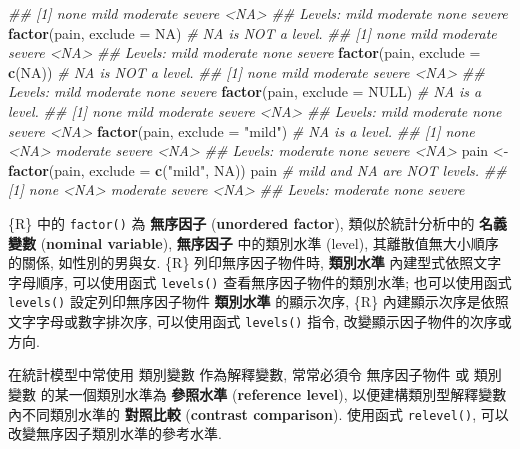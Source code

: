 \documentclass[
]{book}
\newenvironment{Shaded}{\begin{snugshade}}{\end{snugshade}}
\newcommand{\CommentTok}[1]{\textcolor[rgb]{0.56,0.35,0.01}{\textit{#1}}}
\newcommand{\DataTypeTok}[1]{\textcolor[rgb]{0.13,0.29,0.53}{#1}}
\newcommand{\KeywordTok}[1]{\textcolor[rgb]{0.13,0.29,0.53}{\textbf{#1}}}
\newcommand{\NormalTok}[1]{#1}
\newcommand{\OtherTok}[1]{\textcolor[rgb]{0.56,0.35,0.01}{#1}}
\newcommand{\StringTok}[1]{\textcolor[rgb]{0.31,0.60,0.02}{#1}}
\begin{document}
\begin{Shaded}
\begin{Highlighting}[]
\CommentTok{\#\# [1] none     mild     moderate severe   \textless{}NA\textgreater{}    }
\CommentTok{\#\# Levels: mild moderate none severe}
\KeywordTok{factor}\NormalTok{(pain, }\DataTypeTok{exclude =} \OtherTok{NA}\NormalTok{) }\CommentTok{\# NA is NOT a level.}
\CommentTok{\#\# [1] none     mild     moderate severe   \textless{}NA\textgreater{}    }
\CommentTok{\#\# Levels: mild moderate none severe}
\KeywordTok{factor}\NormalTok{(pain, }\DataTypeTok{exclude =} \KeywordTok{c}\NormalTok{(}\OtherTok{NA}\NormalTok{)) }\CommentTok{\# NA is NOT a level.}
\CommentTok{\#\# [1] none     mild     moderate severe   \textless{}NA\textgreater{}    }
\CommentTok{\#\# Levels: mild moderate none severe}
\KeywordTok{factor}\NormalTok{(pain, }\DataTypeTok{exclude =} \OtherTok{NULL}\NormalTok{) }\CommentTok{\# NA is a level.}
\CommentTok{\#\# [1] none     mild     moderate severe   \textless{}NA\textgreater{}    }
\CommentTok{\#\# Levels: mild moderate none severe \textless{}NA\textgreater{}}
\KeywordTok{factor}\NormalTok{(pain, }\DataTypeTok{exclude =} \StringTok{"mild"}\NormalTok{) }\CommentTok{\# NA is a level.}
\CommentTok{\#\# [1] none     \textless{}NA\textgreater{}     moderate severe   \textless{}NA\textgreater{}    }
\CommentTok{\#\# Levels: moderate none severe \textless{}NA\textgreater{}}
\NormalTok{pain \textless{}{-}}\StringTok{ }\KeywordTok{factor}\NormalTok{(pain, }\DataTypeTok{exclude =} \KeywordTok{c}\NormalTok{(}\StringTok{"mild"}\NormalTok{, }\OtherTok{NA}\NormalTok{)) }
\NormalTok{pain }\CommentTok{\# mild and NA are NOT levels.}
\CommentTok{\#\# [1] none     \textless{}NA\textgreater{}     moderate severe   \textless{}NA\textgreater{}    }
\CommentTok{\#\# Levels: moderate none severe}
\end{Highlighting}
\end{Shaded}

\{R\} 中的 \texttt{factor()} 為
\textbf{無序因子}
(\textbf{unordered factor}),
類似於統計分析中的
\textbf{名義變數}
(\textbf{nominal variable}),
\textbf{無序因子}
中的類別水準 (level),
其離散值無大小順序的關係, 如性別的男與女.
\{R\} 列印無序因子物件時,
\textbf{類別水準}
內建型式依照文字字母順序,
可以使用函式
\texttt{levels()}
查看無序因子物件的類別水準;
也可以使用函式
\texttt{levels()}
設定列印無序因子物件 \textbf{類別水準} 的顯示次序,
\{R\} 內建顯示次序是依照文字字母或數字排次序,
可以使用函式
\texttt{levels()} 指令,
改變顯示因子物件的次序或方向.

在統計模型中常使用 類別變數 作為解釋變數,
常常必須令 無序因子物件 或 類別變數
的某一個類別水準為
\textbf{參照水準}
(\textbf{reference level}),
以便建構類別型解釋變數內不同類別水準的
\textbf{對照比較}
(\textbf{contrast comparison}).
使用函式
\texttt{relevel()},
可以改變無序因子類別水準的參考水準.
\end{document}
